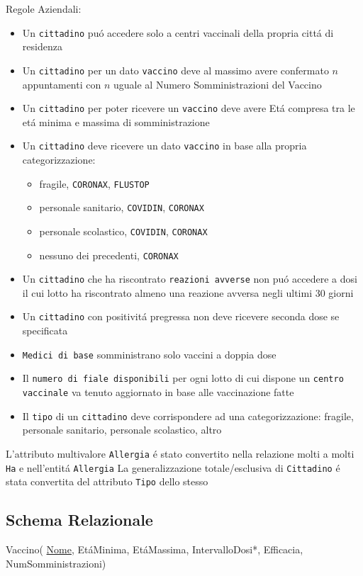 \documentclass[11pt]{article}
\begin{document}
Regole Aziendali:
\begin{itemize}
\item Un \texttt{cittadino} puó accedere solo a centri vaccinali della propria cittá di residenza
\item Un \texttt{cittadino} per un dato \texttt{vaccino} deve al massimo avere confermato \(n\) appuntamenti con \(n\) uguale al Numero Somministrazioni del Vaccino
\item Un \texttt{cittadino} per poter ricevere un \texttt{vaccino} deve avere Etá compresa tra le etá minima e massima di somministrazione
\item Un \texttt{cittadino} deve ricevere un dato \texttt{vaccino} in base alla propria categorizzazione:
\begin{itemize}
\item fragile, \texttt{CORONAX}, \texttt{FLUSTOP}
\item personale sanitario, \texttt{COVIDIN}, \texttt{CORONAX}
\item personale scolastico, \texttt{COVIDIN}, \texttt{CORONAX}
\item nessuno dei precedenti, \texttt{CORONAX}
\end{itemize}
\item Un \texttt{cittadino} che ha riscontrato \texttt{reazioni avverse} non puó accedere a dosi il cui lotto ha riscontrato almeno una reazione avversa negli ultimi 30 giorni
\item Un \texttt{cittadino} con positivitá pregressa non deve ricevere seconda dose se specificata
\item \texttt{Medici di base} somministrano solo vaccini a doppia dose
\item Il \texttt{numero di fiale disponibili} per ogni lotto di cui dispone un \texttt{centro vaccinale} va tenuto aggiornato in base alle vaccinazione fatte
\item Il \texttt{tipo} di un \texttt{cittadino} deve corrispondere ad una categorizzazione: fragile, personale sanitario, personale scolastico, altro
\end{itemize}

L'attributo multivalore \texttt{Allergia} é stato convertito nella relazione molti a molti \texttt{Ha} e nell'entitá \texttt{Allergia}
La generalizzazione totale/esclusiva  di \texttt{Cittadino} é stata convertita del attributo \texttt{Tipo} dello stesso

\subsection{Schema Relazionale}
\label{sec:orgb188241}
Vaccino( \uline{Nome}, EtáMinima, EtáMassima,
            IntervalloDosi*, Efficacia, NumSomministrazioni)
\end{document}
